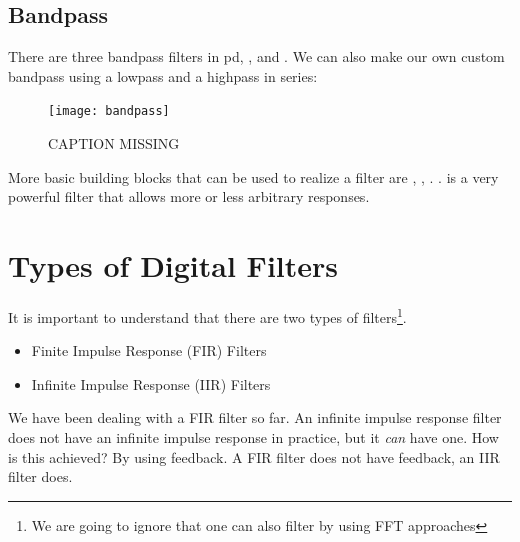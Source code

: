 \subsection{Bandpass} %
There are three bandpass filters in pd, ,  and .
We can also make our own custom bandpass using a lowpass and a highpass in series:
\begin{figure}[H]
	\centering
	\texttt{[image: bandpass]}
	\caption[bandpass]
	{CAPTION MISSING}
	\label{fig:label}
\end{figure}




More basic building blocks that can be used to realize a filter are , , . .  is a very powerful filter that allows more or less arbitrary responses.\\

\section{Types of Digital Filters}

It is important to understand that there are two types of filters\footnote{We are going to ignore that one can also filter by using FFT approaches}. 
\begin{itemize}
	\item Finite Impulse Response (FIR) Filters
	\item Infinite Impulse Response (IIR) Filters
\end{itemize}

We have been dealing with a FIR filter so far. An infinite impulse response filter does not have an infinite impulse response in practice, but it \textit{can} have one. How is this achieved? By using feedback. A FIR filter does not have feedback, an IIR filter does.


